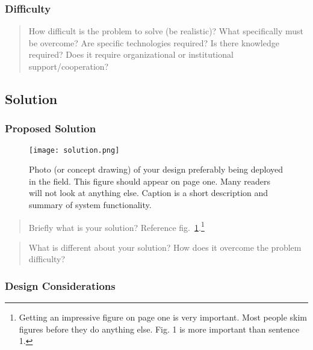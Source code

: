 \documentclass[
  10pt,
  draftcls,
  technote,
  letterpaper,
  oneside,
  onecolumn]{IEEEtran}
\begin{document}
\hypertarget{difficulty}{%
\subsubsection{Difficulty}\label{difficulty}}

\begin{quote}
How difficult is the problem to solve (be realistic)? What specifically
must be overcome? Are specific technologies required? Is there knowledge
required? Does it require organizational or institutional
support/cooperation?
\end{quote}

\hypertarget{solution}{%
\subsection{Solution}\label{solution}}

\hypertarget{proposed-solution}{%
\subsubsection{Proposed Solution}\label{proposed-solution}}

\begin{figure}
\hypertarget{fig:solution}{%
\centering
\texttt{[image: solution.png]}
\caption{Photo (or concept drawing) of your design preferably being
deployed in the field. This figure should appear on page one. Many
readers will not look at anything else. Caption is a short description
and summary of system functionality.}\label{fig:solution}
}
\end{figure}

\begin{quote}
Briefly what is your solution? Reference
fig.~\ref{fig:solution}.\footnote{Getting an impressive figure on page
  one is very important. Most people skim figures before they do
  anything else. Fig. 1 is more important than sentence 1.}
\end{quote}

\begin{quote}
What is different about your solution? How does it overcome the problem
difficulty?
\end{quote}

\hypertarget{design-considerations}{%
\subsubsection{Design Considerations}\label{design-considerations}}
\end{document}
